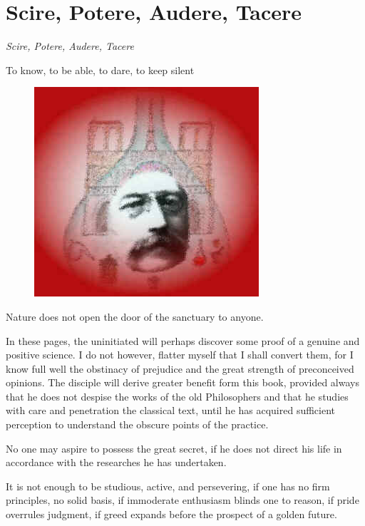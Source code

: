 \section{Scire, Potere, Audere, Tacere}

\begin{quotex}
\emph{Scire, Potere, Audere, Tacere}

To know, to be able, to dare, to keep silent


\end{quotex}

\begin{figure}
\centering
 \includegraphics[scale=.25]{a20100928ScirePotereAudereTacere-img001.jpg} 
\end{figure}

Nature does not open the door of the sanctuary to anyone.

In these pages, the uninitiated will perhaps discover some proof of a genuine and positive science. I do not however, flatter myself that I shall convert them, for I know full well the obstinacy of prejudice and the great strength of preconceived opinions. The disciple will derive greater benefit form this book, provided always that he does not despise the works of the old Philosophers and that he studies with care and penetration the classical text, until he has acquired sufficient perception to understand the obscure points of the practice.

No one may aspire to possess the great secret, if he does not direct his life in accordance with the researches he has undertaken.

It is not enough to be studious, active, and persevering, if one has no firm principles, no solid basis, if immoderate enthusiasm blinds one to reason, if pride overrules judgment, if greed expands before the prospect of a golden future.

